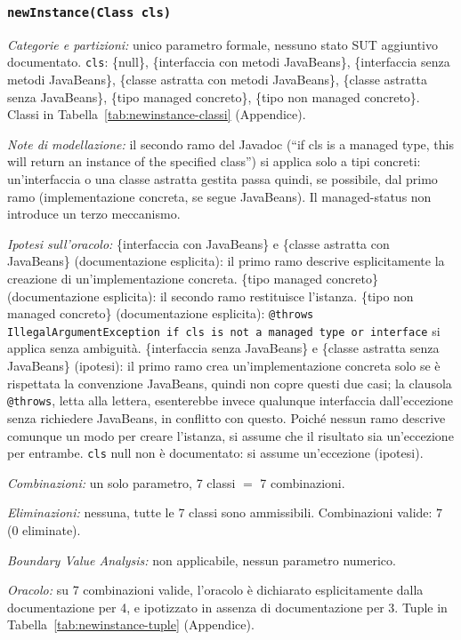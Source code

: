 \subsubsection{\texttt{newInstance(Class cls)}}

\textit{Categorie e partizioni:} unico parametro formale, nessuno stato SUT aggiuntivo
documentato. \texttt{cls}: \{null\}, \{interfaccia con metodi JavaBeans\}, \{interfaccia senza
metodi JavaBeans\}, \{classe astratta con metodi JavaBeans\}, \{classe astratta senza
JavaBeans\}, \{tipo managed concreto\}, \{tipo non managed concreto\}. Classi in
Tabella~\ref{tab:newinstance-classi} (Appendice).

\textit{Note di modellazione:} il secondo ramo del Javadoc (``if cls is a managed type, this
will return an instance of the specified class'') si applica solo a tipi concreti: un'interfaccia
o una classe astratta gestita passa quindi, se possibile, dal primo ramo (implementazione
concreta, se segue JavaBeans). Il managed-status non introduce un terzo meccanismo.

\textit{Ipotesi sull'oracolo:} \{interfaccia con JavaBeans\} e \{classe astratta con JavaBeans\}
(documentazione esplicita): il primo ramo descrive esplicitamente la creazione di
un'implementazione concreta. \{tipo managed concreto\} (documentazione esplicita): il secondo
ramo restituisce l'istanza. \{tipo non managed concreto\} (documentazione esplicita):
\texttt{@throws IllegalArgumentException if cls is not a managed type or
interface} si applica senza ambiguità. \{interfaccia senza JavaBeans\} e \{classe astratta senza
JavaBeans\} (ipotesi): il primo ramo crea un'implementazione concreta solo se è rispettata la
convenzione JavaBeans, quindi non copre questi due casi; la clausola \texttt{@throws}, letta alla
lettera, esenterebbe invece qualunque interfaccia dall'eccezione senza richiedere JavaBeans, in
conflitto con questo. Poiché nessun ramo descrive comunque un modo per creare l'istanza, si
assume che il risultato sia un'eccezione per entrambe. \texttt{cls} null non è
documentato: si assume un'eccezione (ipotesi).

\textit{Combinazioni:} un solo parametro, 7 classi $=$ 7 combinazioni.

\textit{Eliminazioni:} nessuna, tutte le 7 classi sono ammissibili. Combinazioni valide: $7$
(0 eliminate).

\textit{Boundary Value Analysis:} non applicabile, nessun parametro numerico.

\textit{Oracolo:} su 7 combinazioni valide, l'oracolo è dichiarato esplicitamente dalla
documentazione per 4, e ipotizzato in assenza di documentazione per 3. Tuple in
Tabella~\ref{tab:newinstance-tuple} (Appendice).

